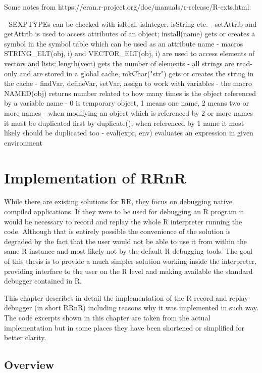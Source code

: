 \documentclass[thesis=M,english,hidelinks]{FITthesis}[2012/10/20]
\begin{document}
Some notes from https://cran.r-project.org/doc/manuals/r-release/R-exts.html:

- SEXPTYPEs can be checked with isReal, isInteger, isString etc.
- setAttrib and getAttrib is used to access attributes of an object; install(name) gets or creates a symbol in the symbol table which can be used as an attribute name
- macros STRING_ELT(obj, i) and VECTOR_ELT(obj, i) are used to access elements of vectors and lists; length(vect) gets the number of elements
- all strings are read-only and are stored in a global cache, mkChar("str") gets or creates the string in the cache
- findVar, defineVar, setVar, assign to work with variables
- the macro NAMED(obj) returns number related to how many times is the object referenced by a variable name - 0 is temporary object, 1 means one name, 2 means two or more names
- when modifying an object which is referenced by 2 or more names it must be duplicated first by duplicate(), when referenced by 1 name it most likely should be duplicated too
- eval(expr, env) evaluates an expression in given environment
\fi

\chapter{Implementation of RRnR}
While there are existing solutions for RR, they focus on debugging native compiled applications. If they were to be used for debugging an R program it would be necessary to record and replay the whole R interpreter running the code. Although that is entirely possible the convenience of the solution is degraded by the fact that the user would not be able to use it from within the same R instance and most likely not by the default R debugging tools. The goal of this thesis is to provide a much simpler solution working inside the interpreter, providing interface to the user on the R level and making available the standard debugger contained in R.\par

This chapter describes in detail the implementation of the R record and replay debugger (in short RRnR) including reasons why it was implemented in such way. The code excerpts shown in this chapter are taken from the actual implementation but in some places they have been shortened or simplified for better clarity.\par

	\section{Overview}
\end{document}
